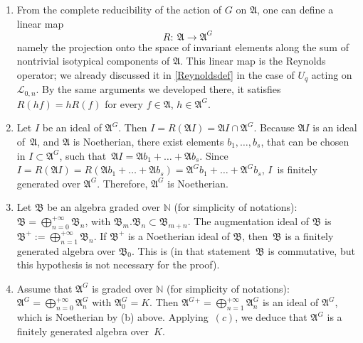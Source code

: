 \documentclass[10pt,a4paper]{amsart}
\numberwithin{equation}{section}
\theoremstyle{definition}
\newcommand{\mn}{\mathbb{N}}
\newcommand{\Ll}{{\mathcal L}}
\begin{document}
\begin{enumerate}\itemsep=0pt
\item[(a)] From the complete reducibility of the action of $G$ on $\mathfrak{A}$, one can define a linear map
\[R\colon \ \mathfrak{A}\rightarrow \mathfrak{A}^G\]
namely the projection onto the space of invariant elements along the sum of nontrivial isotypical components of $\mathfrak{A}$. This linear map is the Reynolds operator; we already discussed it in \eqref{Reynoldsdef} in the case of $U_q$ acting on $\Ll_{0,n}$. By the same arguments we developed there, it satisfies $R(hf)=hR(f)$ for every $f\in \mathfrak{A}$, $h\in \mathfrak{A}^G$.

\item[(b)] Let $I$ be an ideal of $\mathfrak{A}^G$. Then $I=R(\mathfrak{A} I)=\mathfrak{A} I\cap \mathfrak{A}^G$. Because $\mathfrak{A}I$ is an ideal of~$\mathfrak{A}$, and $\mathfrak{A}$ is Noetherian, there exist elements $b_1,\dots , b_s$, that can be chosen in $I\subset \mathfrak{A}^G$, such that~${\mathfrak{A}I= \mathfrak{A} b_1+\dots + \mathfrak{A} b_s}$. Since $I=R(\mathfrak{A} I)=R(\mathfrak{A}b_1+\dots + \mathfrak{A}b_s)=\mathfrak{A}^Gb_1+\dots + \mathfrak{A}^G b_s$, $I$~is finitely generated over $\mathfrak{A}^G$. Therefore, $\mathfrak{A}^G$ is Noetherian.

\item[(c)] Let $\mathfrak{B}$ be an algebra graded over $\mn$ (for simplicity of notations): $ \mathfrak{B}=\bigoplus_{n=0}^{+\infty }\mathfrak{B}_n$, with ${\mathfrak{B}_m.\mathfrak{B}_n \subset \mathfrak{B}_{m+n}}$. The augmentation ideal of $\mathfrak{B}$ is $ \mathfrak{B}^+:=\bigoplus_{n=1}^{+\infty }\mathfrak{B}_n$. If $\mathfrak{B}^+$ is a Noetherian ideal of $\mathfrak{B}$, then~$\mathfrak{B}$ is a finitely generated algebra over $\mathfrak{B}_0$. This is \cite[Lemma~2.4.5]{Sp} (in that statement~$\mathfrak{B}$ is commutative, but this hypothesis is not necessary for the proof).

\item[(d)] Assume that $\mathfrak{A}^G$ is graded over $\mn$ (for simplicity of notations): $ \mathfrak{A}^G=\bigoplus_{n=0}^{+\infty }\mathfrak{A}^G_n$ with ${\mathfrak{A}^G_0=K}$. Then $ \mathfrak{A}^G{}^+=\bigoplus_{n=1}^{+\infty }\mathfrak{A}^G_n$ is an ideal of $\mathfrak{A}^G$, which is Noetherian by (b) above. Applying~$(c)$, we deduce that $\mathfrak{A}^G$ is a finitely generated algebra over~$K$.
\end{enumerate}
\end{document}
